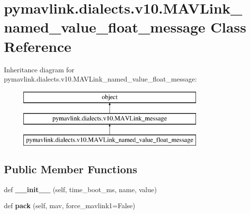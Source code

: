 \hypertarget{classpymavlink_1_1dialects_1_1v10_1_1MAVLink__named__value__float__message}{}\section{pymavlink.\+dialects.\+v10.\+M\+A\+V\+Link\+\_\+named\+\_\+value\+\_\+float\+\_\+message Class Reference}
\label{classpymavlink_1_1dialects_1_1v10_1_1MAVLink__named__value__float__message}
Inheritance diagram for pymavlink.\+dialects.\+v10.\+M\+A\+V\+Link\+\_\+named\+\_\+value\+\_\+float\+\_\+message\+:\begin{figure}[H]
\begin{center}
\leavevmode
\includegraphics[height=3.000000cm]{classpymavlink_1_1dialects_1_1v10_1_1MAVLink__named__value__float__message}
\end{center}
\end{figure}
\subsection*{Public Member Functions}
\begin{DoxyCompactItemize}
\item 
\mbox{\label{classpymavlink_1_1dialects_1_1v10_1_1MAVLink__named__value__float__message_a5488d32547ce43148e2e5b348806567e}} 
def {\bfseries \+\_\+\+\_\+init\+\_\+\+\_\+} (self, time\+\_\+boot\+\_\+ms, name, value)
\item 
\mbox{\label{classpymavlink_1_1dialects_1_1v10_1_1MAVLink__named__value__float__message_aa8273fd5bf79a01df34cab895775550b}} 
def {\bfseries pack} (self, mav, force\+\_\+mavlink1=False)
\end{DoxyCompactItemize}
